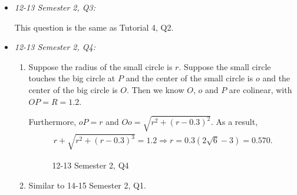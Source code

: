 \documentclass{article}
\begin{document}
\begin{itemize}
\item \emph{12-13 Semester 2, Q3:}
  
This question is the same as Tutorial 4, Q2.

\item \emph{12-13 Semester 2, Q4:}
  \begin{enumerate}[label=(\alph*)]
  \item Suppose the radius of the small circle is $r$. Suppose the small circle touches the big circle at $P$ and the center of the small circle is $o$ and the center of the big circle is $O$. Then we know $O$, $o$ and $P$ are colinear, with $OP = R = 1.2$.
    
Furthermore, $oP = r $ and $Oo = \sqrt{r^2+(r-0.3)^2}$. As a result,
\begin{align*}
  r + \sqrt{r^2+(r-0.3)^3} = 1.2\Rightarrow r = 0.3(2\sqrt{6}-3) = 0.570.
\end{align*}

\begin{figure}[ht]
  \centering
\caption{12-13 Semester 2, Q4}
\end{figure}

\item Similar to 14-15 Semester 2, Q1.
\end{enumerate}

\end{itemize}
\end{document}
